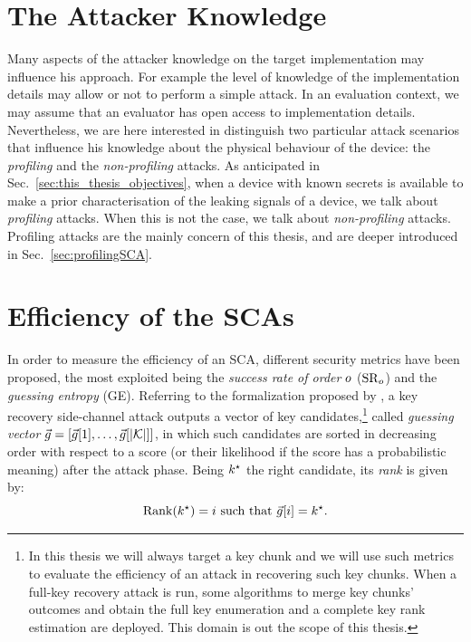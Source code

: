 \section{The Attacker Knowledge}
Many aspects of the attacker knowledge on the target implementation may influence his approach. For example the level of knowledge of the implementation details may allow or not to perform a simple attack. In an evaluation context, we may assume that an evaluator has open access to implementation details. Nevertheless, we are here interested in distinguish two particular attack scenarios that influence his knowledge about the physical behaviour of the device: the \emph{profiling} and the \emph{non-profiling} attacks.
As anticipated in Sec.~\ref{sec:this_thesis_objectives}, when a device with known secrets is available to make a prior characterisation of the leaking signals of a device, we talk about \emph{profiling} attacks. When this is not the case, we talk about \emph{non-profiling} attacks. Profiling attacks are the mainly concern of this thesis, and are deeper introduced in Sec.~\ref{sec:profilingSCA}. \\


\section{Efficiency of the SCAs}\label{sec:metrics}
In order to measure the efficiency of an SCA, different security metrics have been proposed, the most exploited being the \emph{success rate of order} $o$ ($\mathrm{SR}_o$) and the \emph{guessing entropy} (GE). Referring to the formalization proposed by \cite{unifiedFramework}, a key recovery side-channel attack outputs a vector of key candidates,\footnote{In this thesis we will always target a key chunk and we will use such metrics to evaluate the efficiency of an attack in recovering such key chunks. When a full-key recovery attack is run, some algorithms to merge key chunks' outcomes and obtain the full key enumeration and a complete key rank estimation are deployed. This domain is out the scope of this thesis.} called {\em guessing vector} $\vec{g} = \left[\vec{g}[1], \dots, \vec{g}[{\lvert \mathcal{K} \rvert}]\right]$, in which such candidates are sorted in decreasing order with respect to a score (or their likelihood if the score has a probabilistic meaning) after the attack phase. Being $k^\star$ the right candidate, its \emph{rank} is given by:
\begin{equation}
\mathrm{Rank}(k^\star) = i \mbox{ such that } \vec{g}[i] = k^\star \mbox{.}
\end{equation}

